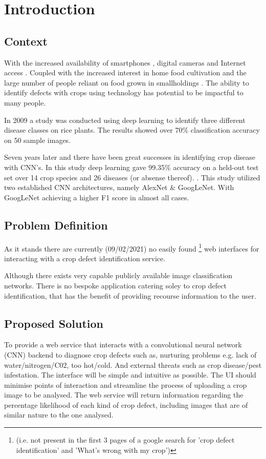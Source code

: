 \chapter{Introduction}
\label{introduction}

\section{Context}
  With the increased availability of smartphones \cite{Statista:2021}, digital cameras \cite{ImarcGroup} and Internet access \cite{Wikipedia} \cite{Globaltt}. Coupled with the increased interest in home food cultivation \cite{Google} and the large number of people reliant on food grown in smallholdings \cite{JLIFADSmallHolders}. The ability to identify defects with crops using technology has potential to be impactful to many people.
  \par
  In 2009 a study was conducted using deep learning to identify three different disease classes on rice plants. The results showed over 70\% classification accuracy on 50 sample images. \cite{Anthonys2009}
  \par
  Seven years later and there have been great successes in identifying crop disease with CNN's. In this study deep learning gave 99.35\% accuracy on a held-out test set over 14 crop species and 26 diseases (or absense thereof). \cite{Mohanty2016}. This study utilized two established CNN architectures, namely AlexNet \cite{Krizhevsky} & GoogLeNet. \cite{Szegedy_2015_CVPR} With GoogLeNet achieving a higher F1 score in almost all cases.
  \par

\section{Problem Definition}
  As it stands there are currently (09/02/2021) no easily found \footnote[1]{(i.e. not present in the first 3 pages of a google search for 'crop defect identification' and 'What's wrong with my crop')} web interfaces for interacting with a crop defect identification service.
  \par
  Although there exists very capable publicly available image classification networks. \cite{Yandex} There is no bespoke application catering soley to crop defect identification, that has the benefit of providing recourse information to the user.

\section{Proposed Solution}
  To provide a web service that interacts with a convolutional neural network (CNN) backend to diagnose crop defects such as, nurturing problems e.g. lack of water/nitrogen/C02, too hot/cold. And external threats such as crop disease/pest infestation. The interface will be simple and intuitive as possible. The UI should minimise points of interaction and streamline the process of uploading a crop image to be analysed.
	The web service will return information regarding the percentage likelihood of each kind of crop defect, including images that are of similar nature to the one analysed.

